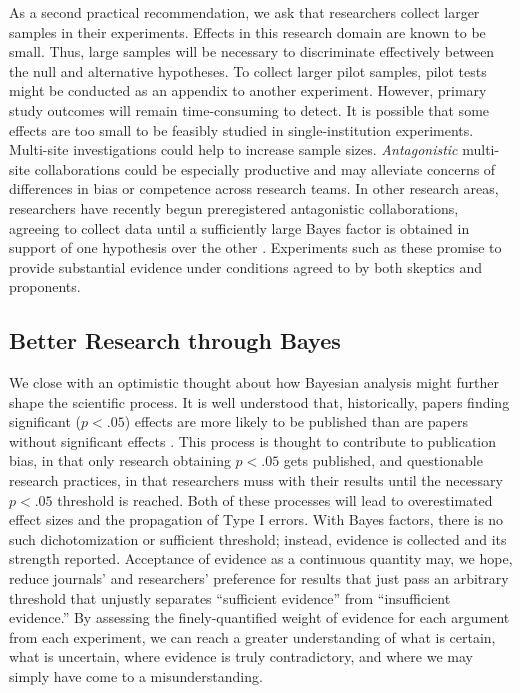\documentclass[man]{apa6}
\begin{document}
As a second practical recommendation, we ask that researchers collect larger samples in their experiments. Effects in this research domain are known to be small. Thus, large samples will be necessary to discriminate effectively between the null and alternative hypotheses. To collect larger pilot samples, pilot tests might be conducted as an appendix to another experiment. However, primary study outcomes will remain time-consuming to detect. It is possible that some effects are too small to be feasibly studied in single-institution experiments. Multi-site investigations could help to increase sample sizes. {\em Antagonistic} multi-site collaborations could be especially productive and may alleviate concerns of differences in bias or competence across research teams. 
In other research areas, researchers have recently begun preregistered antagonistic collaborations, agreeing to collect data until a sufficiently large Bayes factor is obtained in support of one hypothesis over the other \citep[e.g.,][]{Matzke:etal:submitted}. Experiments such as these promise to provide substantial evidence under conditions agreed to by both skeptics and proponents.

\subsection{Better Research through Bayes}
We close with an optimistic thought about how Bayesian analysis might further shape the scientific process. It is well understood that, historically, papers finding significant ($p < .05$) effects are more likely to be published than are papers without significant effects \citep{Atkinson:etal:1982,Cooper:etal:1997,McDaniel:etal:2006}. 
This process is thought to contribute to publication bias, in that only research obtaining $p<.05$ gets published, and questionable research practices, in that researchers muss with their results until the necessary $p < .05$ threshold is reached. Both of these processes will lead to overestimated effect sizes and the propagation of Type I errors. 
With Bayes factors, there is no such dichotomization or sufficient threshold; instead, evidence is collected and its strength reported. Acceptance of evidence as a continuous quantity may, we hope, reduce journals' and researchers' preference for results that just pass an arbitrary threshold that unjustly separates ``sufficient evidence'' from ``insufficient evidence.'' By assessing the finely-quantified weight of evidence for each argument from each experiment, we can reach a greater understanding of what is certain, what is uncertain, where evidence is truly contradictory, and where we may simply have come to a misunderstanding.
\end{document}
